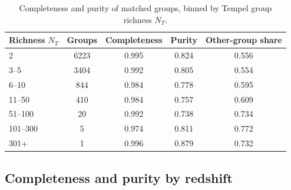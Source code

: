 \documentclass[9pt,a4paper,twocolumn,twoside]{rho-class/rho}
\begin{document}
\begin{table}[H]
    \caption{Completeness and purity of matched groups, binned by Tempel
    group richness $N_T$.}
    \label{tab:richness}
    \centering
    \begin{tabular}{lcccc}
        \toprule
        Richness $N_T$ & Groups & Completeness & Purity & Other-group share \\
        \midrule
        2          & 6223 & 0.995 & 0.824 & 0.556 \\
        3--5     & 3404 & 0.992 & 0.805 & 0.554 \\
        6--10    & 844  & 0.984 & 0.778 & 0.595 \\
        11--50   & 410  & 0.984 & 0.757 & 0.609 \\
        51--100  & 20   & 0.992 & 0.738 & 0.734 \\
        101--300 & 5    & 0.974 & 0.811 & 0.772 \\
        301+     & 1    & 0.996 & 0.879 & 0.732 \\
        \bottomrule
    \end{tabular}
\end{table}

\subsection{Completeness and purity by redshift}
\end{document}
